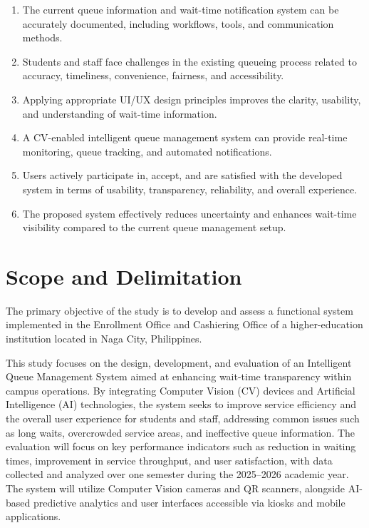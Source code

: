 \documentclass{research}
\begin{document}
\begin{enumerate}
    \item The current queue information and wait-time notification system can be accurately documented, including workflows, tools, and communication methods.
    \item Students and staff face challenges in the existing queueing process related to accuracy, timeliness, convenience, fairness, and accessibility.
    \item Applying appropriate UI/UX design principles improves the clarity, usability, and understanding of wait-time information.
    \item A CV-enabled intelligent queue management system can provide real-time monitoring, queue tracking, and automated notifications.
    \item Users actively participate in, accept, and are satisfied with the developed system in terms of usability, transparency, reliability, and overall experience.
    \item The proposed system effectively reduces uncertainty and enhances wait-time visibility compared to the current queue management setup.
\end{enumerate}

\section{Scope and Delimitation}

The primary objective of the study is to develop and assess a functional system implemented in the Enrollment Office and Cashiering Office of a higher-education institution located in Naga City, Philippines.

This study focuses on the design, development, and evaluation of an Intelligent Queue Management System aimed at enhancing wait-time transparency within campus operations. By integrating Computer Vision (CV) devices and Artificial Intelligence (AI) technologies, the system seeks to improve service efficiency and the overall user experience for students and staff, addressing common issues such as long waits, overcrowded service areas, and ineffective queue information. The evaluation will focus on key performance indicators such as reduction in waiting times, improvement in service throughput, and user satisfaction, with data collected and analyzed over one semester during the 2025--2026 academic year. The system will utilize Computer Vision cameras and QR scanners, alongside AI-based predictive analytics and user interfaces accessible via kiosks and mobile applications.
\end{document}
